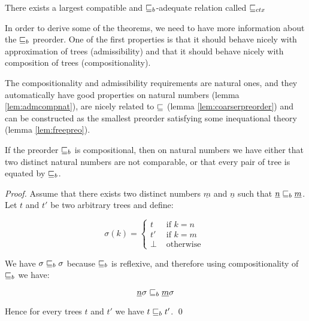 \begin{adefinition}
    There exists a largest compatible and $\sqsubseteq_b$-adequate 
    relation called $\sqsubseteq_{ctx}$
\end{adefinition}

In order to derive some of the theorems, we need to have more information 
about the $\sqsubseteq_b$ preorder. One of the first properties is that 
it should behave nicely with approximation of trees (admissibility) and 
that it should behave nicely with composition of trees (compositionality).

\vspace{1em}

The compositionality and admissibility requirements are 
natural ones, and they automatically have good properties 
on natural numbers (lemma \ref{lem:admcompnat}),
are nicely related to $\sqsubseteq$ (lemma \ref{lem:coarserpreorder})
and can be constructed as the smallest preorder 
satisfying some inequational theory (lemma \ref{lem:freepreo}).

\begin{alemma}
    \label{lem:admcompnat}
    If the preorder $\sqsubseteq_b$ is  
    compositional, then on natural 
    numbers we have either that two distinct 
    natural numbers are not comparable, 
    or that every pair of tree is equated  
    by $\sqsubseteq_b$.
\end{alemma}



\begin{proof}
    Assume that there exists two distinct numbers $\underline{m}$
    and $\underline{n}$ such that $\underline{n} \sqsubseteq_b \underline{m}$.
    Let $t$ and $t'$ be 
    two arbitrary trees and define:

    \begin{equation*}
        \sigma(k) = \begin{cases}
            t  & \text{ if } k = n \\
            t' & \text{ if } k = m \\
            \bot  & \text{ otherwise } 
        \end{cases}
    \end{equation*}

    We have $\sigma \sqsubseteq_b \sigma$ because $\sqsubseteq_b$
    is reflexive, and therefore using compositionality 
    of $\sqsubseteq_b$ we have:

    \begin{equation*}
        \underline{n}\sigma \sqsubseteq_b \underline{m}\sigma
    \end{equation*}

    Hence for every trees $t$ and $t'$ we have 
    $t \sqsubseteq_b t'$.
\qed\end{proof}

